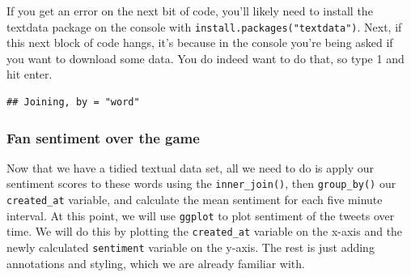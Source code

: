 \documentclass[]{book}
\newenvironment{Shaded}{\begin{snugshade}}{\end{snugshade}}
\newcommand{\DataTypeTok}[1]{\textcolor[rgb]{0.13,0.29,0.53}{#1}}
\newcommand{\KeywordTok}[1]{\textcolor[rgb]{0.13,0.29,0.53}{\textbf{#1}}}
\newcommand{\NormalTok}[1]{#1}
\newcommand{\OperatorTok}[1]{\textcolor[rgb]{0.81,0.36,0.00}{\textbf{#1}}}
\newcommand{\StringTok}[1]{\textcolor[rgb]{0.31,0.60,0.02}{#1}}
\begin{document}
If you get an error on the next bit of code, you'll likely need to install the textdata package on the console with \texttt{install.packages("textdata")}. Next, if this next block of code hangs, it's because in the console you're being asked if you want to download some data. You do indeed want to do that, so type 1 and hit enter.

\begin{Shaded}
\end{Shaded}

\begin{verbatim}
## Joining, by = "word"
\end{verbatim}

\hypertarget{fan-sentiment-over-the-game}{%
\subsubsection{Fan sentiment over the game}\label{fan-sentiment-over-the-game}}

Now that we have a tidied textual data set, all we need to do is apply our sentiment scores to these words using the \texttt{inner\_join()}, then \texttt{group\_by()} our \texttt{created\_at} variable, and calculate the mean sentiment for each five minute interval. At this point, we will use \texttt{ggplot} to plot sentiment of the tweets over time. We will do this by plotting the \texttt{created\_at} variable on the x-axis and the newly calculated \texttt{sentiment} variable on the y-axis. The rest is just adding annotations and styling, which we are already familiar with.

\begin{Shaded}
\end{Shaded}
\end{document}
